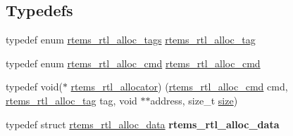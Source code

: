 \subsection*{Typedefs}
\begin{DoxyCompactItemize}
\item 
typedef enum \mbox{\hyperlink{rtl-allocator_8h_a7c05573cbeda9e9091ba58ceaf0fa2cc}{rtems\+\_\+rtl\+\_\+alloc\+\_\+tags}} \mbox{\hyperlink{rtl-allocator_8h_a445a8615118b7fc14005ab20583153fd}{rtems\+\_\+rtl\+\_\+alloc\+\_\+tag}}
\item 
typedef enum \mbox{\hyperlink{rtl-allocator_8h_aab433aa2d9689f924523cc8196318daf}{rtems\+\_\+rtl\+\_\+alloc\+\_\+cmd}} \mbox{\hyperlink{rtl-allocator_8h_afbca5741746edb9e51e1cce92f68f96e}{rtems\+\_\+rtl\+\_\+alloc\+\_\+cmd}}
\item 
typedef void($\ast$ \mbox{\hyperlink{rtl-allocator_8h_aa8af44a7337cfbfe72b669c82a604bb7}{rtems\+\_\+rtl\+\_\+allocator}}) (\mbox{\hyperlink{rtl-allocator_8h_aab433aa2d9689f924523cc8196318daf}{rtems\+\_\+rtl\+\_\+alloc\+\_\+cmd}} cmd, \mbox{\hyperlink{rtl-allocator_8h_a445a8615118b7fc14005ab20583153fd}{rtems\+\_\+rtl\+\_\+alloc\+\_\+tag}} tag, void $\ast$$\ast$address, size\+\_\+t \mbox{\hyperlink{sun4u_2tte_8h_a245260f6f74972558f61b85227df5aae}{size}})
\item 
\mbox{\label{rtl-allocator_8h_aa5f46781ef3f4b2051faf0e8860a4ac3}} 
typedef struct \mbox{\hyperlink{structrtems__rtl__alloc__data}{rtems\+\_\+rtl\+\_\+alloc\+\_\+data}} {\bfseries rtems\+\_\+rtl\+\_\+alloc\+\_\+data}
\end{DoxyCompactItemize}
